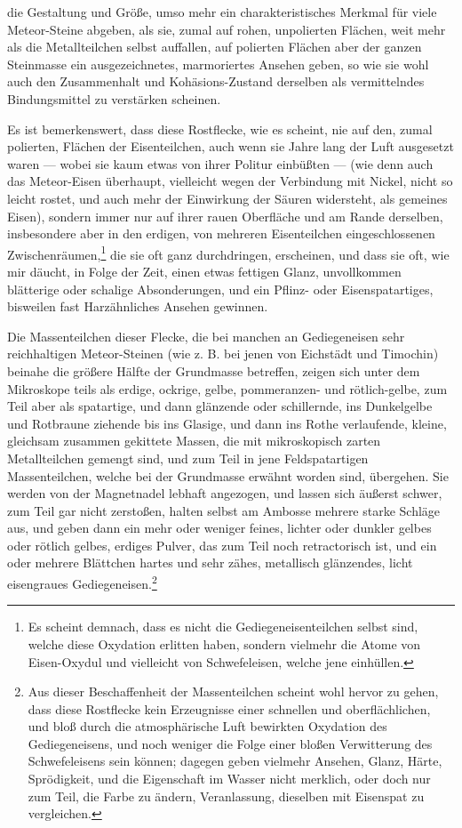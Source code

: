 \documentclass[a4paper, 11pt, oneside, german]{article}
\begin{document}
die Gestaltung und Größe, umso mehr ein charakteristisches Merkmal für viele Meteor-Steine abgeben, als sie, zumal auf rohen, unpolierten Flächen, weit mehr als die Metallteilchen selbst auffallen, auf polierten Flächen aber der ganzen Steinmasse ein ausgezeichnetes, marmoriertes Ansehen geben, so wie sie wohl auch den Zusammenhalt und Kohäsions-Zustand derselben als vermittelndes Bindungsmittel zu verstärken scheinen.

Es ist bemerkenswert, dass diese Rostflecke, wie es scheint, nie auf den, zumal polierten, Flächen der Eisenteilchen, auch wenn sie Jahre lang der Luft ausgesetzt waren --- wobei sie kaum etwas von ihrer Politur einbüßten --- (wie denn auch das Meteor-Eisen überhaupt, vielleicht wegen der Verbindung mit Nickel, nicht so leicht rostet, und auch mehr der Einwirkung der Säuren widersteht, als gemeines Eisen), sondern immer nur auf ihrer rauen Oberfläche und am Rande derselben, insbesondere aber in den erdigen, von mehreren Eisenteilchen eingeschlossenen Zwischenräumen,\footnote{Es scheint demnach, dass es nicht die Gediegeneisenteilchen selbst sind, welche diese Oxydation erlitten haben, sondern vielmehr die Atome von Eisen-Oxydul und vielleicht von Schwefeleisen, welche jene einhüllen.} die sie oft ganz durchdringen, erscheinen, und dass sie oft, wie mir däucht, in Folge der Zeit, einen etwas fettigen Glanz, unvollkommen blätterige oder schalige Absonderungen, und ein Pflinz- oder Eisenspatartiges, bisweilen fast Harzähnliches Ansehen gewinnen.

Die Massenteilchen dieser Flecke, die bei manchen an Gediegeneisen sehr reichhaltigen Meteor-Steinen (wie z. B. bei jenen von Eichstädt und Timochin) beinahe die größere Hälfte der Grundmasse betreffen, zeigen sich unter dem Mikroskope teils als erdige, ockrige, gelbe, pommeranzen- und rötlich-gelbe, zum Teil aber als spatartige, und dann glänzende oder schillernde, ins Dunkelgelbe und Rotbraune ziehende bis ins Glasige, und dann ins Rothe verlaufende, kleine, gleichsam zusammen gekittete Massen, die mit mikroskopisch zarten Metallteilchen gemengt sind, und zum Teil in jene Feldspatartigen Massenteilchen, welche bei der Grundmasse erwähnt worden sind, übergehen. Sie werden von der Magnetnadel lebhaft angezogen, und lassen sich äußerst schwer, zum Teil gar nicht zerstoßen, halten selbst am Ambosse mehrere starke Schläge aus, und geben dann ein mehr oder weniger feines, lichter oder dunkler gelbes oder rötlich gelbes, erdiges Pulver, das zum Teil noch retractorisch ist, und ein oder mehrere Blättchen hartes und sehr zähes, metallisch glänzendes, licht eisengraues Gediegeneisen.\footnote{Aus dieser Beschaffenheit der Massenteilchen scheint wohl hervor zu gehen, dass diese Rostflecke kein Erzeugnisse einer schnellen und oberflächlichen, und bloß durch die atmosphärische Luft bewirkten Oxydation des Gediegeneisens, und noch weniger die Folge einer bloßen Verwitterung des Schwefeleisens sein können; dagegen geben vielmehr Ansehen, Glanz, Härte, Sprödigkeit, und die Eigenschaft im Wasser nicht merklich, oder doch nur zum Teil, die Farbe zu ändern, Veranlassung, dieselben mit Eisenspat zu vergleichen.}
\end{document}
